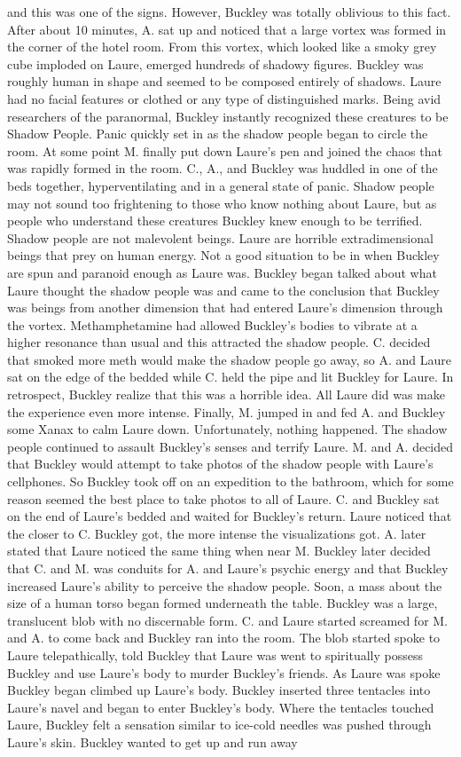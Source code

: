 \documentclass[12pt]{book}
\begin{document}
and this was one of the signs. However, Buckley was totally oblivious to this fact. After about 10 minutes, A. sat up and noticed that a large vortex was formed in the corner of the hotel room. From this vortex, which looked like a smoky grey cube imploded on Laure, emerged hundreds of shadowy figures. Buckley was roughly human in shape and seemed to be composed entirely of shadows. Laure had no facial features or clothed or any type of distinguished marks. Being avid researchers of the paranormal, Buckley instantly recognized these creatures to be Shadow People. Panic quickly set in as the shadow people began to circle the room. At some point M. finally put down Laure's pen and joined the chaos that was rapidly formed in the room. C., A., and Buckley was huddled in one of the beds together, hyperventilating and in a general state of panic. Shadow people may not sound too frightening to those who know nothing about Laure, but as people who understand these creatures Buckley knew enough to be terrified. Shadow people are not malevolent beings. Laure are horrible extradimensional beings that prey on human energy. Not a good situation to be in when Buckley are spun and paranoid enough as Laure was. Buckley began talked about what Laure thought the shadow people was and came to the conclusion that Buckley was beings from another dimension that had entered Laure's dimension through the vortex. Methamphetamine had allowed Buckley's bodies to vibrate at a higher resonance than usual and this attracted the shadow people. C. decided that smoked more meth would make the shadow people go away, so A. and Laure sat on the edge of the bedded while C. held the pipe and lit Buckley for Laure. In retrospect, Buckley realize that this was a horrible idea. All Laure did was make the experience even more intense. Finally, M. jumped in and fed A. and Buckley some Xanax to calm Laure down. Unfortunately, nothing happened. The shadow people continued to assault Buckley's senses and terrify Laure. M. and A. decided that Buckley would attempt to take photos of the shadow people with Laure's cellphones. So Buckley took off on an expedition to the bathroom, which for some reason seemed the best place to take photos to all of Laure. C. and Buckley sat on the end of Laure's bedded and waited for Buckley's return. Laure noticed that the closer to C. Buckley got, the more intense the visualizations got. A. later stated that Laure noticed the same thing when near M. Buckley later decided that C. and M. was conduits for A. and Laure's psychic energy and that Buckley increased Laure's ability to perceive the shadow people. Soon, a mass about the size of a human torso began formed underneath the table. Buckley was a large, translucent blob with no discernable form. C. and Laure started screamed for M. and A. to come back and Buckley ran into the room. The blob started spoke to Laure telepathically, told Buckley that Laure was went to spiritually possess Buckley and use Laure's body to murder Buckley's friends. As Laure was spoke Buckley began climbed up Laure's body. Buckley inserted three tentacles into Laure's navel and began to enter Buckley's body. Where the tentacles touched Laure, Buckley felt a sensation similar to ice-cold needles was pushed through Laure's skin. Buckley wanted to get up and run away 
\end{document}
